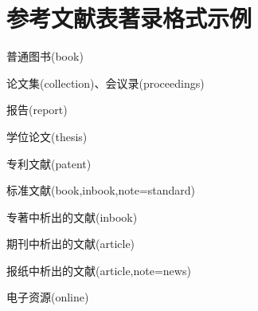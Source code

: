 \section{参考文献表著录格式示例}\label{sec:eg:gb77142015}
\begin{refsection}
普通图书(book)
\cite{张伯伟2002--}
\cite{2009-155-155}
\cite{胡承正2010-112-112}
\cite{美国妇产科医师学会2010-38-39}
\cite{1962-50-50}
\cite{汪昂1881--}
\cite{蒋有绪1998--}
\cite{中国企业投资协会2013--}
\cite{罗斯基2009--}
\cite{库恩2012--}
\cite{候文顺2010-119-119}
\cite{CRAWFPRD1995--}
\cite{IFLAI1977--}
\cite{OBRIEN1994--}
\cite{Kinchy2012-50-50}
\cite{Praetzellis2011-13-13}

论文集(collection)、会议录(proceedings)
\cite{中国职工教育研究会1985--}
\cite{中国社会科学院台湾史研究中心2012--}
\cite{雷光春2012--}
\cite{陈志勇2011--}
\cite{Babu2014--}

报告(report)
\cite{中华人民共和国国务院新闻办公室2013-04-16--}
\cite{汤万金2013-09-30--}
\cite{Calkin2011-8-9}
\cite{DTFHA1990--}
\cite{WHO1970--}

学位论文(thesis)
\cite{马欢2011-27-27}
\cite{吴云芳2003--}
\cite{CALMS1965--}

专利文献(patent)
\cite{张凯军2012-04-05--}
\cite{河北绿洲生态环境科技有限公司2001--}
\cite{KOSEKI2002--}

标准文献(book,inbook,note=standard)
\cite{全国信息文献标准化技术委员会2010-3-3}
\cite{全国广播电视标准化技术委员会2007-1-1}
\cite{国家环境保护局科技标准司1996-2-3}
\cite{standardinfoiso158}

专著中析出的文献(inbook)
\cite{1988-590-590}
\cite{白书农1998-146-163}
\cite{汪学军2002-22-25}
\cite{国家标准局信息分类编码研究所1988-59-92}
\cite{1977-49-49}
\cite{楼梦麟2011-11-12}
\cite{BUSECK1980-117-211}
\cite{FOURNEY1971-17-38}

期刊中析出的文献(article)
\cite{杨洪升2013-56-75}
\cite{李炳穆2000-5-8}
\cite{于潇2012-1518-1523}
\cite{陈建军2010-93-93}
\cite{DESMARAIS1992-605-609}
\cite{Saito2006-169-176}
\cite{Walls2013-399-418}
\cite{Franz2013-1053-1062}
\cite{Park2010-696-715}

报纸中析出的文献(article,note=news)
\cite{丁文祥2000--}
\cite{张田勤2000--}
\cite{傅刚2000--}
\cite{刘裕国2013-01-12--}

电子资源(online)
\cite{萧钰2001--}
\cite{李强2012-05-03--}
\cite{Commonwealth--}
\cite{Dublin2012-06-14--}



\end{refsection}
